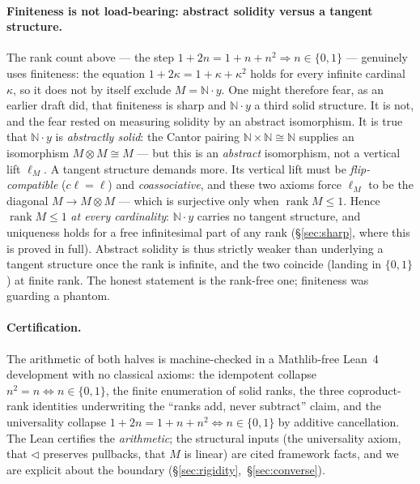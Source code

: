 \documentclass[11pt]{article}
\theoremstyle{definition}
\newcommand{\N}{\mathbb{N}}
\newcommand{\rank}{\operatorname{rank}}
\begin{document}
\paragraph{Finiteness is not load-bearing: abstract solidity versus a tangent structure.}
The rank count above --- the step $1+2n=1+n+n^2\Rightarrow n\in\{0,1\}$ --- genuinely uses
finiteness: the equation $1+2\kappa=1+\kappa+\kappa^2$ holds for every infinite cardinal $\kappa$, so
it does not by itself exclude $M=\N\cdot y$. One might therefore fear, as an earlier draft did, that
finiteness is sharp and $\N\cdot y$ a third solid structure. It is not, and the fear rested on
measuring solidity by an abstract isomorphism. It is true that $\N\cdot y$ is \emph{abstractly solid}: the
Cantor pairing $\N\times\N\cong\N$ supplies an isomorphism $M\otimes M\cong M$ --- but this is an
\emph{abstract} isomorphism, not a vertical lift $\ell_M$. A tangent structure demands more. Its vertical lift must
be \emph{flip-compatible} ($c\ell=\ell$) and \emph{coassociative}, and these two axioms force
$\ell_M$ to be the diagonal $M\to M\otimes M$ --- which is surjective only when $\rank M\le1$. Hence
$\rank M\le1$ \emph{at every cardinality}: $\N\cdot y$ carries no tangent structure, and uniqueness
holds for a free infinitesimal part of any rank (\S\ref{sec:sharp}, where this is proved in full).
Abstract solidity is thus strictly weaker than
underlying a tangent structure once the rank is infinite, and the two coincide (landing in
$\{0,1\}$) at finite rank. The honest statement is the rank-free one; finiteness was guarding a
phantom.

\paragraph{Certification.}
The arithmetic of both halves is machine-checked in a Mathlib-free Lean~4 development with no
classical axioms: the idempotent collapse $n^2=n\iff n\in\{0,1\}$, the finite enumeration of solid
ranks, the three coproduct-rank identities underwriting the ``ranks add, never subtract'' claim,
and the universality collapse $1+2n=1+n+n^2\iff n\in\{0,1\}$ by additive cancellation. The Lean
certifies the \emph{arithmetic}; the structural inputs (the universality axiom, that $\lhd$
preserves pullbacks, that $M$ is linear) are cited framework facts, and we are explicit about the
boundary (\S\ref{sec:rigidity},~\S\ref{sec:converse}).
\end{document}

